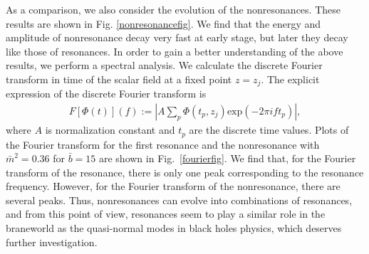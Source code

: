 As a comparison, we also consider the evolution of the nonresonances.  These results are shown in Fig. \ref{nonresonancefig}. We find that the energy and amplitude of nonresonance decay very fast at early stage, but later they decay like those of resonances. In order to gain a better understanding of the above results, we perform a spectral analysis. We calculate the discrete Fourier transform in time of the scalar field at a fixed point $z=z_{j}$. The explicit expression of the discrete Fourier transform is
\begin{eqnarray}
F[\Phi(t)](f):=|A\sum_{p}\Phi(t_{p},z_{j})\text{exp}(-2\pi ift_{p} )|,\label{Fourier transform}
\end{eqnarray}
where $A$ is normalization constant and $t_{p}$ are the discrete time values. Plots of the Fourier transform for the first resonance and the nonresonance with $\bar{m}^2=0.36$ for $\bar{b}=15$ are shown in Fig.~\ref{fourierfig}. We find that, for the Fourier transform of the resonance, there is only one peak corresponding to the resonance frequency. However, for the Fourier transform of the nonresonance, there are several peaks.  Thus, nonresonances can evolve into combinations of resonances, and from this point of view, resonances seem to play a similar role in the braneworld as the quasi-normal modes in black holes physics, which deserves further investigation.
\begin{figure*}
\centering
{}
\caption{Upper panel: The energy of the scalar field vs. time for the evolution of nonresonance for $\bar{b}=15$. Lower panel: Time evolution of the nonresonance with $\bar{z}_{\text{ext}}=30$ for $\bar{b}=15$. }\label{nonresonancefig}
\end{figure*}


\begin{figure*}
\centering
{}
\caption{Left panel: Discrete Fourier transform in time vs. frequency for the evolution of the nonresonance with $\bar{m}^2=0.36$ for $\bar{b}=15$. Right panel: Discrete Fourier transform in time vs. frequency for the evolution of the first resonance with $\bar{m}_1^2=0.04687$ for $\bar{b}=15$. The blue dotted lines correspond to the frequencies of the first three odd parity resonances. }\label{fourierfig}
\end{figure*}

